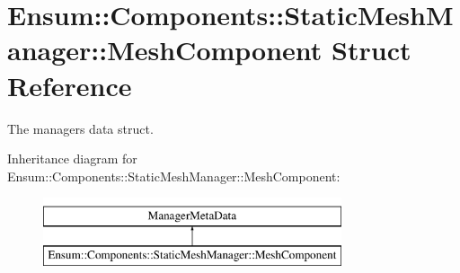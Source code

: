 \hypertarget{struct_ensum_1_1_components_1_1_static_mesh_manager_1_1_mesh_component}{}\section{Ensum\+:\+:Components\+:\+:Static\+Mesh\+Manager\+:\+:Mesh\+Component Struct Reference}
\label{struct_ensum_1_1_components_1_1_static_mesh_manager_1_1_mesh_component}


The managers data struct.  


Inheritance diagram for Ensum\+:\+:Components\+:\+:Static\+Mesh\+Manager\+:\+:Mesh\+Component\+:\begin{figure}[H]
\begin{center}
\leavevmode
\includegraphics[height=2.000000cm]{struct_ensum_1_1_components_1_1_static_mesh_manager_1_1_mesh_component}
\end{center}
\end{figure}
